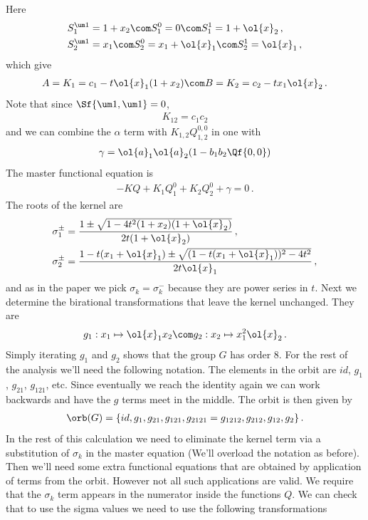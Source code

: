 Here
\begin{align}
	S_1^{\um 1} &= 1+x_2\com S_1^0 = 0\com S_1^1 = 1+\ol{x}_2\,,\\
	S_2^{\um 1} &= x_1\com S_2^0 = x_1+\ol{x}_1\com S_2^1 = \ol{x}_1\,,
\end{align}
which give
\begin{align}
	A = K_1 = c_1 - t\ol{x}_1(1+x_2)\com B = K_2 = c_2 - t x_1\ol{x}_2\,.
\end{align}
Note that since $\Sf{\um 1,\um 1} = 0$,
\begin{align}
	K_{12} = c_1c_2
\end{align}
and we can combine the $\alpha$ term with $K_{1,2}Q_{1,2}^{0,0}$ in one with
\begin{align}
	\gamma = \ol{a}_1\ol{a}_2(1-b_1b_2\Qf{0,0})
\end{align}
The master functional equation is
\begin{align}
-KQ + K_1 Q_1^0 + K_2 Q_2^0 +\gamma = 0\,.
\end{align}
The roots of the kernel are
\begin{align}
	\sigma_1^\pm &= \frac{1\pm\sqrt{1-4t^2(1+x_2)(1+\ol{x}_2)}}{2t(1+\ol{x}_2)}\,,\\
	\sigma_2^\pm &= \frac{1-t(x_1+\ol{x}_1) \pm \sqrt{(1-t(x_1+\ol{x}_1))^2 - 4t^2}}{2t\ol{x}_1}\,,
\end{align}
and as in the paper we pick $\sigma_k = \sigma_k^{-}$ because they are power series in $t$. Next we determine the birational transformations that leave the kernel unchanged. They are
\begin{align}
	g_1: x_1 \mapsto \ol{x}_1x_2\com g_2: x_2 \mapsto x_1^2 \ol{x}_2\,.
\end{align}
Simply iterating $g_1$ and $g_2$  shows that the group $G$ has order 8. For the rest of the analysis we'll need the following notation.
The elements in the orbit are $id$, $g_1$, $g_{21}$, $g_{121}$, etc. Since eventually we reach the identity again we can work backwards and have the $g$ terms meet in the middle. The orbit is then given by
\begin{align}
	\orb(G) = \{id, g_1, g_{21},g_{121},g_{2121}=g_{1212}, g_{212},g_{12},g_{2}\}\,.
\end{align}
In the rest of this calculation we need to eliminate the kernel term via a substitution of $\sigma_k$ in the master equation (We'll overload the notation as before). Then we'll need some extra functional equations that are obtained by application of terms from the orbit. However not all such applications are valid. We require that the $\sigma_k$ term appears in the numerator inside the functions $Q$. We can check that to use the sigma values we need to use the following transformations
